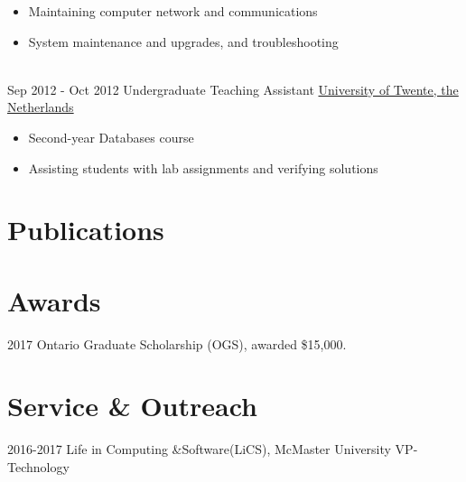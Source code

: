 \documentclass[letterpaper]{twentysecondcv} %
\begin{document}
\begin{twenty}
{\begin{itemize}
			\item Maintaining computer network and communications
			\item System maintenance and upgrades, and troubleshooting
	\end{itemize}}
	\\
	\twentyitem
	{Sep 2012 -}
	{Oct 2012}
	{Undergraduate Teaching Assistant}
	{\href{https://www.utwente.nl/}{University of Twente, the Netherlands}}
	{}
	{\begin{itemize}
			\item Second-year Databases course
			\item Assisting students with lab assignments and verifying solutions
	\end{itemize}}
	
\end{twenty}



\section{Publications}
 \printbibliography[heading=none]
 

\section{Awards}

2017 \quad   Ontario Graduate Scholarship (OGS), awarded \$15,000.

\section{Service \& Outreach}
2016-2017 \quad Life in Computing \&Software(LiCS), McMaster University    \quad VP-Technology
\end{document}
